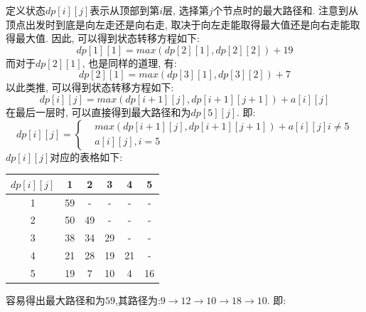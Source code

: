 \documentclass[../../main.tex]{subfiles}
\begin{document}
\begin{solution}
定义状态$dp[i][j]$表示从顶部到第$i$层, 选择第$j$个节点时的最大路径和.
注意到从顶点出发时到底是向左走还是向右走, 取决于向左走能取得最大值还是向右走能取得最大值.
因此, 可以得到状态转移方程如下:
\begin{equation*}
    dp[1][1] = max(dp[2][1], dp[2][2]) + 19
\end{equation*}
而对于\(dp[2][1]\), 也是同样的道理, 有:
\begin{equation*}
    dp[2][1] = max(dp[3][1], dp[3][2]) + 7
\end{equation*}
以此类推, 可以得到状态转移方程如下:
\begin{equation*}
    dp[i][j] = max(dp[i+1][j], dp[i+1][j+1]) + a[i][j]
\end{equation*}
在最后一层时, 可以直接得到最大路径和为$dp[5][j]$. 即:
\begin{equation*}
    dp[i][j] =
    \left\{
    \begin{aligned}
        & max(dp[i+1][j], dp[i+1][j+1]) + a[i][j] i \neq 5\\
        & a[i][j] , i=5
    \end{aligned}
    \right.
\end{equation*}
\(dp[i][j]\)对应的表格如下:
\begin{table}[ht!]
  \begin{center}
    \begin{tabular}{c|c|c|c|c|c} 
    \(dp[i][j]\) &  1 &  2 &  3 &  4 & 5 \\ \hline
    1            & 59 &  - &  - &  - & - \\ \hline
    2            & 50 & 49 &  - &  - & - \\ \hline
    3            & 38 & 34 & 29 &  - & - \\ \hline
    4            & 21 & 28 & 19 & 21 & - \\ \hline
    5            & 19 &  7 & 10 &  4 & 16\\ 
    \end{tabular}
  \end{center}
\end{table}
\newpage
容易得出最大路径和为$59$,其路径为:$9 \rightarrow 12 \rightarrow 10 \rightarrow 18 \rightarrow 10$.
即:
\begin{center}
\end{center}
\end{solution}
\end{document}
